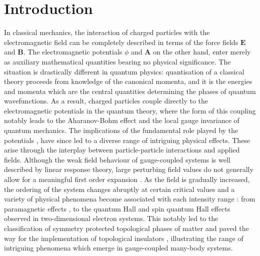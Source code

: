 \documentclass[twocolumn, nofootinbib, nobibnotes, amsmath,amssymb,aps, pra, floatfix]{revtex4-1}
\renewcommand{\v}[1]{\ensuremath{\mathbf{#1}}} %
\begin{document}
\maketitle

\section{\label{sec:intro}Introduction}
In classical mechanics, the interaction of charged particles with the electromagnetic field can be completely described in terms of the force fields $\v{E}$ and $\v{B}$.
The electromagnetic potentials $\phi$ and $\v{A}$ on the other hand, enter merely as auxiliary mathematical quantities bearing no physical significance.
The situation is drastically different in quantum physics: quantisation of a classical theory proceeds from knowledge of the canonical momenta, and it is the energies and momenta which are the central quantities determining the phases of quantum wavefunctions.
As a result, charged particles couple directly to the electromagnetic potentials in the quantum theory, where the form of this coupling notably leads to the Aharanov-Bohm effect and the local gauge invariance of quantum mechanics.
The implications of the fundamental role played by the potentials \cite{aharonov1959significance}, have since led to a diverse range of intriguing physical effects.
These arise through the interplay between particle-particle interactions and applied fields. 
Although the weak field behaviour of gauge-coupled systems is well described by linear response theory, large perturbing field values do not generally allow for a meaningful first order expansion \cite{matt2012}.
As the field is gradually increased, the ordering of the system changes abruptly at certain critical values and a variety of physical phenomena become associated with each intensity range \cite{faze99}: from paramagnetic effects \cite{ston1935}, to the quantum Hall \cite{klitzing1980new,yennie1987integral,pran87} and spin quantum Hall \cite{kane2005quantum,kane2005z,fu2007topological,bernevig2006quantum} effects observed in two-dimensional electron systems.
This notably led to the classification of symmetry protected topological phases of matter \cite{thouless1982quantized,chen2013symmetry} and paved the way for the implementation of topological insulators \cite{qi2011topological,hasan2010colloquium}, illustrating the range of intriguing phenomena which emerge in gauge-coupled many-body systems.\\\\
\end{document}
